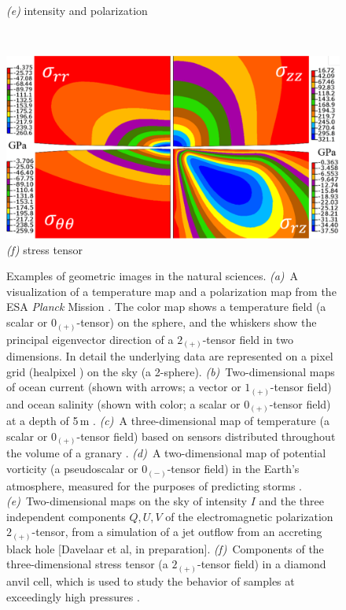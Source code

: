 \documentclass{article}
\newenvironment{hoggfigure}{%
  \begin{figure}[tp]%
    \begin{mdframed}%
    \color{captiongray}}{%
    \end{mdframed}%
  \end{figure}}
\theoremstyle{definition}
\newcommand{\tensorname}[2]{{#1}_{(#2)}}
\newcommand{\tensor}[2]{$\tensorname{#1}{#2}$-tensor}
\begin{document}
\begin{hoggfigure}
\begin{center}
\begin{minipage}[b]{1.9in}
      \textsl{(e)} intensity and polarization
    \end{minipage}
    ~~\begin{minipage}[b]{2.5in}\noindent%
      \includegraphics[width=\textwidth]{41524.pdf}\\[1ex]
      \textsl{(f)} stress tensor
    \end{minipage}
  \end{center}
  \caption{Examples of geometric images in the natural sciences.
  \textsl{(a)}~A visualization of a temperature map and a polarization map from the ESA \textsl{Planck} Mission \cite{planck2015}.
  The color map shows a temperature field (a scalar or \tensor{0}{+}) on the sphere, and the whiskers show the principal eigenvector direction of a \tensor{2}{+} field in two dimensions.
  In detail the underlying data are represented on a pixel grid (healpixel \cite{healpix}) on the sky (a 2-sphere).
  \textsl{(b)}~Two-dimensional maps of ocean current (shown with arrows; a vector or \tensor{1}{+} field) and ocean salinity (shown with color; a scalar or \tensor{0}{+} field) at a depth of 5\,m \cite{climatedataguide}.
  \textsl{(c)}~A three-dimensional map of temperature (a scalar or \tensor{0}{+} field) based on sensors distributed throughout the volume of a granary \cite{granary}.
  \textsl{(d)}~A two-dimensional map of potential vorticity (a pseudoscalar or \tensor{0}{-} field) in the Earth's atmosphere, measured for the purposes of predicting storms \cite{potentialvorticity}.
  \textsl{(e)}~Two-dimensional maps on the sky of intensity $I$ and the three independent components $Q, U, V$ of the electromagnetic polarization \tensor{2}{+}, from a simulation of a jet outflow from an accreting black hole [Davelaar et al, in preparation].
  \textsl{(f)}~Components of the three-dimensional stress tensor (a \tensor{2}{+} field) in a diamond anvil cell, which is used to study the behavior of samples at exceedingly high pressures \cite{diamond}.
  \label{fig:examples}}
\end{hoggfigure}
\end{document}
